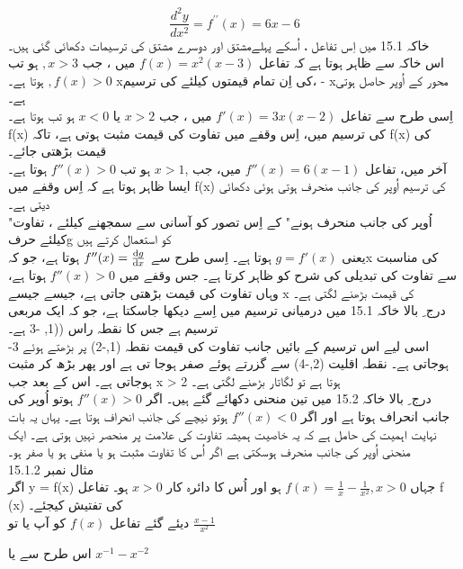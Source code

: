 \[\frac{d^{2}y}{dx^{2}}=f^{\prime\prime}\left(x\right)=6x-6 \]
خاکہ  15.1  میں اِس تفاعل ،  اُسکے پہلےمشتق  اور دوسرے مشتق کی ترسیمات دکھائی گئی ہیں۔ \\
اس خاکہ سے ظاہر ہوتا ہے کہ  تفاعل
\(f(x)=x^2(x-3)\)
  میں ،  
  جب 
\(,x>3\)
     ہو تب 
\(,f(x)>0\)
     ہوتا ہے۔  xکی اِن تمام قیمتوں کیلئے کی ترسیم،   - xمحور کے اُوپر حاصل ہوتی ہے۔ \\
اِسی طرح سے تفاعل 
\(f'(x)=3x(x-2)\)
میں ،  جب
\(x>2\)
 یا  
 \(x<0\)
  ہو تب ہوتا ہے۔
   f(x)
 کی ترسیم میں،  اِس وقفے میں تفاوت کی قیمت مثبت ہوتی ہے، تاکہ f(x) کی قیمت بڑھتی جائے۔ \\
آخر میں،  تفاعل 
\(f''(x)=6(x-1)\)
میں،  
جب
,\(x>1\)
 ہو تب
  \(f''(x)>0\)
  ہوتا ہے۔ ایسا ظاہر ہوتا ہے کہ اِس وقفے میں f(x)  کی ترسیم اُوپر کی جانب منحرف ہوتی ہوئی دکھائی دیتی ہے۔ \\
"اُوپر کی جانب منحرف ہونے"   کے اِس تصور کو آسانی سے سمجھنے کیلئے ، تفاوت کیلئے حرفg  کو استعمال کرتے ہیں\\
 یعنی
\(g=f'(x)\)
 ہوتا ہے۔  اِسی طرح سے 
\(f''(x)=\frac{\dif g}{\dif x}\)
 ہوتا ہے،   جو کہx  کی مناسبت سے تفاوت کی تبدیلی کی شرح کو ظاہر کرتا ہے۔ جس وقفے میں
  \(f''(x)>0\)
 ہوتا ہے،  وہاں تفاوت کی قیمت بڑھتی جاتی ہے،  جیسے جیسے x   کی قیمت بڑھنے لگتی ہے۔ \\
درج  ِ بالا خاکہ  15.1   میں درمیانی ترسیم میں اِسے دیکھا جاسکتا ہے،  جو کہ ایک مربعی ترسیم ہے جس کا نقطہ راس ((1, -3   ہے۔\\
اسی لیے اس ترسیم کے بائیں جانب تفاوت کی قیمت نقطہ (1,-2)  پر بڑھتے ہوئے 3-  ہوجاتی ہے۔  نقطہ اقلیت (2,-4)  سے گزرتے ہوئے صفر ہوجا تی ہے اور پھر بڑھ کر مثبت ہوجاتی ہے۔ اس کے بعد جب x > 2  ہوتا ہے تو لگاتار بڑھنے لگتی ہے۔ \\
درج  ِ بالا خاکہ  15.2   میں تین منحنی دکھائے گئے ہیں۔  اگر 
  \(f''(x)>0\)
ہوتو  اُوپر کی جانب انحراف ہوتا ہے  اور اگر
  \(f''(x)<0\) 
  ہوتو  نیچے کی جانب انحراف ہوتا ہے۔   یہاں یہ بات نہایت اہمیت کی حامل ہے کہ یہ خاصیت ہمیشہ تفاوت کی علامت پر منحصر نہیں ہوتی ہے۔ ایک منحنی اُوپر کی جانب منحرف ہوسکتی ہے  اگر  اُس کا تفاوت مثبت  ہو یا  منفی  ہو  یا  صفر ہو۔ \\
مثال نمبر  15.1.2  \\
  اگر  y = f(x)     جہاں  
  \(f(x)=\frac{1}{x}- \frac{1}{x^{2}},x>0\)
   ہو اور اُس کا دائرہ کار   
   \(x>0\)
    ہو۔ تفاعل  f (x) کی تفتیش کیجئے۔\\
دیئے گئے تفاعل 
\(f(x)\)
   کو آپ یا تو 
   \( \frac{x-1}{x^{2}}  \)

       اس طرح  سے  یا   
    \( x^{-1}-x^{-2} \)

